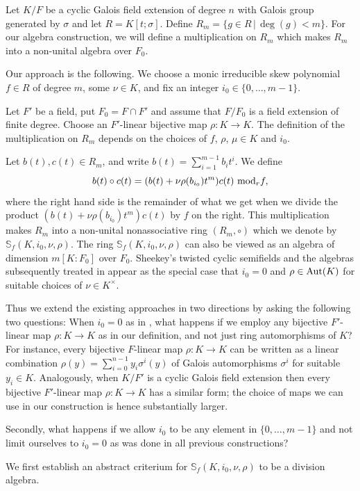 \documentclass[12pt]{amsart}
\theoremstyle{plain}
\theoremstyle{definition}
\numberwithin{equation}{section}
\numberwithin{figure}{section}
\begin{document}
Let $K/F$ be a cyclic Galois field extension of degree $n$ with Galois group generated by $\sigma$ and let $R=K[t;\sigma]$. Define $R_m=\{ g\in R\,|\, \deg(g)<m \}$. For our algebra construction, we will define a multiplication on $R_m$ which makes $R_m$ into a non-unital algebra over $F_0$.


Our approach is the following. We choose a monic irreducible skew polynomial $f\in R$  of degree $m$, some $\nu\in K$, and fix an integer $i_0\in \{0,\dots, m-1\}$.

  Let  $F'$ be a field,  put $F_0=F\cap F'$ and assume that $F/F_0$  is a  field extension of finite degree. Choose an $F'$-linear bijective map $\rho:K\to K$. The definition of the multiplication on $R_m$ depends on the choices of $f$, $\rho$, $\mu\in K$ and $i_0$.

Let $b(t), c(t)\in R_m$, and write $b(t)=\sum_{i=1}^{m-1} b_it^i $. We  define
$$b(t)\circ c(t)= (b(t)+\nu\rho(b_{i_0})t^m )c(t)\,\,{\rm mod}_r f,$$
where the right hand side is the remainder of what we get when we divide the product $(b(t)+\nu\rho(b_{i_0})t^m )c(t)$ by $f$ on the right.
This multiplication makes $R_m$ into a non-unital nonassociative ring $(R_m,\circ)$
which we denote by  $\mathbb{S}_f(K,i_0,\nu,\rho)$. The ring $\mathbb{S}_f(K,i_0,\nu,\rho)$ can also be viewed as an algebra of dimension $m[K:F_0]$ over $F_0$.
 Sheekey's twisted cyclic semifields and the algebras  subsequently treated in  \cite{NewS} appear as the special case that $i_0=0$ and $\rho\in {\rm Aut}(K)$
 for suitable choices of $\nu\in K^\times$.

Thus we extend the existing approaches in two directions by asking the following two questions: When $i_0=0$ as in \cite{Sheekey, PT2, NewS},
  what happens if we  employ any bijective $F'$-linear map $\rho:K\to K$ as in our definition, and not just ring automorphisms of $K$?  For instance,  every bijective $F$-linear map $\rho:K\to K$ can be written as a linear combination  $\rho(y)= \sum_{i=0}^{n-1}y_i\sigma^i(y)$  of Galois automorphisms $\sigma^i$
  for suitable $y_i\in K$. Analogously, when $K/F'$ is a cyclic Galois field extension then every bijective $F'$-linear map $\rho:K\to K$  has a similar form; the  choice of maps we can use in our construction is hence substantially larger.

  Secondly, what happens if we allow $i_0$ to be any element in $ \{ 0,\dots, m-1 \}$ and not limit ourselves to $i_0=0$ as was done in all previous constructions?

We first  establish an abstract criterium for $\mathbb{S}_f(K,i_0,\nu,\rho)$ to be a division algebra.
\end{document}
